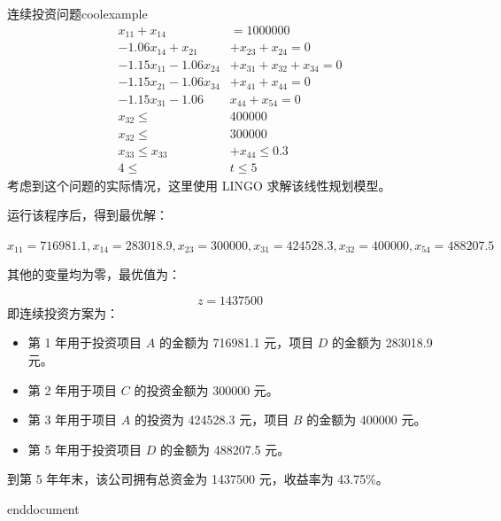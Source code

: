 \begin{exbox}{连续投资问题}{coolexample}
            \[
            \begin{aligned}
            x_{11} + x_{14} &= 1000000 \\
            -1.06 x_{14} + x_{21} &+ x_{23} + x_{24} = 0 \\
            -1.15 x_{11} - 1.06 x_{24} &+ x_{31} + x_{32} + x_{34} = 0 \\
            -1.15 x_{21} - 1.06 x_{34} &+ x_{41} + x_{44} = 0 \\
            -1.15 x_{31} - 1.06  &x_{44} + x_{54} = 0 \\
            x_{32} \leq &400000 \\
            x_{32} \leq &300000 \\
            x_{33} \leq x_{33} &+ x_{44} \leq 0.3 \\
            4 \leq &t \leq 5
            \end{aligned}
            \]
            考虑到这个问题的实际情况，这里使用 LINGO 求解该线性规划模型。

            运行该程序后，得到最优解：

            $
            x_{11} = 716981.1
            ,
            x_{14} = 283018.9
            ,
            x_{23} = 300000
            ,
            x_{31} = 424528.3
            ,
            x_{32} = 400000
            ,
            x_{54} = 488207.5
            $
            
            其他的变量均为零，最优值为：

            \[
            z = 1437500
            \]
            即连续投资方案为：
            \begin{itemize}
                \item 第 1 年用于投资项目 \(A\) 的金额为 716981.1 元，项目 \(D\) 的金额为 283018.9 元。
                \item 第 2 年用于项目 \(C\) 的投资金额为 300000 元。
                \item 第 3 年用于项目 \(A\) 的投资为 424528.3 元，项目 \(B\) 的金额为 400000 元。
                \item 第 5 年用于投资项目 \(D\) 的金额为 488207.5 元。
            \end{itemize}
            到第 5 年年末，该公司拥有总资金为 1437500 元，收益率为 43.75\%。
            \end{exbox}

            
\ifx\allfiles\undefined
	
	
	
	end{document}
	\else
	\fi